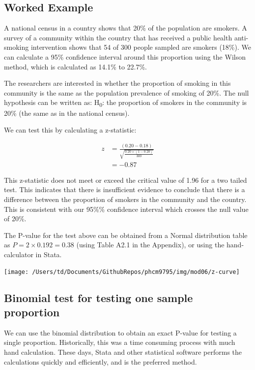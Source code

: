 \documentclass[
]{memoir}
\begin{document}
\hypertarget{z-prop-example}{%
\subsection{Worked Example}\label{z-prop-example}}

A national census in a country shows that 20\% of the population are smokers. A survey of a community within the country that has received a public health anti-smoking intervention shows that 54 of 300 people sampled are smokers (18\%). We can calculate a 95\% confidence interval around this proportion using the Wilson method, which is calculated as 14.1\% to 22.7\%.

The researchers are interested in whether the proportion of smoking in this community is the same as the population prevalence of smoking of 20\%. The null hypothesis can be written as: H\textsubscript{0}: the proportion of smokers in the community is 20\% (the same as in the national census).

We can test this by calculating a z-statistic:

\[
\begin{aligned}
z &= \frac{(0.20 - 0.18)}{\sqrt{\frac{0.20 × (1 - 0.20)}{300}}} \\
 &= -0.87
\end{aligned}
\]

This z-statistic does not meet or exceed the critical value of 1.96 for a two tailed test. This indicates that there is insufficient evidence to conclude that there is a difference between the proportion of smokers in the community and the country. This is consistent with our 95\%\% confidence interval which crosses the null value of 20\%.

The P-value for the test above can be obtained from a Normal distribution table as \(P = 2 × 0.192 = 0.38\) (using Table A2.1 in the Appendix), or using the hand-calculator in Stata.

\texttt{[image: /Users/td/Documents/GithubRepos/phcm9795/img/mod06/z-curve]}

\hypertarget{binomial-test-for-testing-one-sample-proportion}{%
\subsection{Binomial test for testing one sample proportion}\label{binomial-test-for-testing-one-sample-proportion}}

We can use the binomial distribution to obtain an exact P-value for testing a single proportion. Historically, this was a time consuming process with much hand calculation. These days, Stata and other statistical software performs the calculations quickly and efficiently, and is the preferred method.
\end{document}
